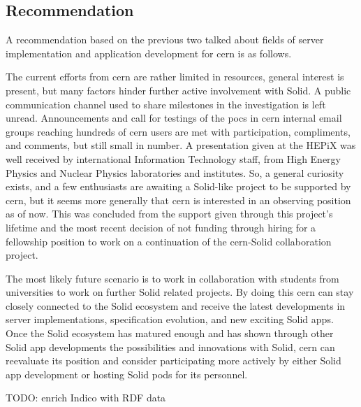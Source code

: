\subsection{Recommendation}

A recommendation based on the previous two talked about fields of server implementation and application development for \gls{cern} is as follows.

The current efforts from \gls{cern} are rather limited in resources, general interest is present, but many factors hinder further active involvement with Solid. A public communication channel used to share milestones in the investigation is left unread. Announcements and call for testings of the \glspl{poc} in \gls{cern} internal email groups reaching hundreds of \gls{cern} users are met with participation, compliments, and comments, but still small in number. A presentation given at the HEPiX \cite{hepix} was well received by international Information Technology staff, from High Energy Physics and Nuclear Physics laboratories and institutes. So, a general curiosity exists, and a few enthusiasts are awaiting a Solid-like project to be supported by \gls{cern}, but it seems more generally that \gls{cern} is interested in an observing position as of now. This was concluded from the support given through this project's lifetime and the most recent decision of not funding through hiring for a fellowship position to work on a continuation of the \gls{cern}-Solid collaboration project.

The most likely future scenario is to work in collaboration with students from universities to work on further Solid related projects. By doing this \gls{cern} can stay closely connected to the Solid ecosystem and receive the latest developments in server implementations, specification evolution, and new exciting Solid apps. Once the Solid ecosystem has matured enough and has shown through other Solid app developments the possibilities and innovations with Solid, \gls{cern} can reevaluate its position and consider participating more actively by either Solid app development or hosting Solid pods for its personnel.

TODO: enrich Indico with RDF data